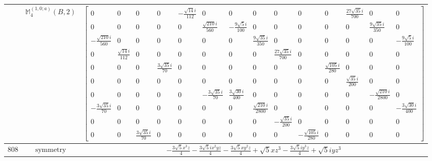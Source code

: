\documentclass[fleqn,8pt,landscape]{jsarticle}
\begin{document}
\begin{longtable}{ccc}
$  $ & $ \mathbb{M}_{4}^{(1,0;a)}(B,2) $ & $ \begin{bmatrix} 0 & 0 & 0 & 0 & - \frac{\sqrt{14} i}{112} & 0 & 0 & 0 & 0 & 0 & 0 & \frac{27 \sqrt{35} i}{700} & 0 & 0 \\ 0 & 0 & 0 & 0 & 0 & \frac{\sqrt{210} i}{560} & - \frac{9 \sqrt{5} i}{100} & 0 & 0 & 0 & 0 & 0 & \frac{9 \sqrt{35} i}{350} & 0 \\ - \frac{\sqrt{210} i}{560} & 0 & 0 & 0 & 0 & 0 & 0 & \frac{9 \sqrt{35} i}{350} & 0 & 0 & 0 & 0 & 0 & - \frac{9 \sqrt{5} i}{100} \\ 0 & \frac{\sqrt{14} i}{112} & 0 & 0 & 0 & 0 & 0 & 0 & \frac{27 \sqrt{35} i}{700} & 0 & 0 & 0 & 0 & 0 \\ 0 & 0 & 0 & \frac{3 \sqrt{35} i}{70} & 0 & 0 & 0 & 0 & 0 & 0 & \frac{\sqrt{105} i}{280} & 0 & 0 & 0 \\ 0 & 0 & 0 & 0 & 0 & 0 & 0 & 0 & 0 & 0 & 0 & \frac{\sqrt{35} i}{200} & 0 & 0 \\ 0 & 0 & 0 & 0 & 0 & - \frac{3 \sqrt{35} i}{70} & \frac{3 \sqrt{30} i}{400} & 0 & 0 & 0 & 0 & 0 & - \frac{\sqrt{210} i}{2800} & 0 \\ - \frac{3 \sqrt{35} i}{70} & 0 & 0 & 0 & 0 & 0 & 0 & \frac{\sqrt{210} i}{2800} & 0 & 0 & 0 & 0 & 0 & - \frac{3 \sqrt{30} i}{400} \\ 0 & 0 & 0 & 0 & 0 & 0 & 0 & 0 & - \frac{\sqrt{35} i}{200} & 0 & 0 & 0 & 0 & 0 \\ 0 & 0 & \frac{3 \sqrt{35} i}{70} & 0 & 0 & 0 & 0 & 0 & 0 & - \frac{\sqrt{105} i}{280} & 0 & 0 & 0 & 0 \end{bmatrix} $ \\ \hline
$ 808 $ & $ \text{symmetry} $ & $ - \frac{3 \sqrt{5} x^{3} z}{4} - \frac{3 \sqrt{5} i x^{2} y z}{4} - \frac{3 \sqrt{5} x y^{2} z}{4} + \sqrt{5} x z^{3} - \frac{3 \sqrt{5} i y^{3} z}{4} + \sqrt{5} i y z^{3} $ \\

\end{longtable}
\end{document}
